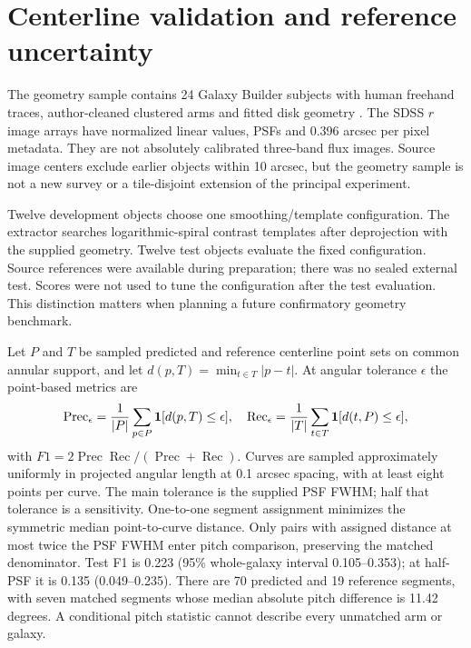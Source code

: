 \documentclass[10pt]{article}
\begin{document}
\section{Centerline validation and reference uncertainty}
The geometry sample contains 24 Galaxy Builder subjects with human freehand
traces, author-cleaned clustered arms and fitted disk geometry
\citep{lingard2020,lingard2021}. The SDSS $r$ image arrays have normalized
linear values, PSFs and 0.396 arcsec per pixel metadata. They are not
absolutely calibrated three-band flux images. Source image centers exclude
earlier objects within 10 arcsec, but the geometry sample is not a new
survey or a tile-disjoint extension of the principal experiment.

Twelve development objects choose one smoothing/template configuration.
The extractor searches logarithmic-spiral contrast templates after
deprojection with the supplied geometry. Twelve test objects evaluate the
fixed configuration. Source references were available during preparation;
there was no sealed external test. Scores were not used to tune the
configuration after the test evaluation. This distinction matters when
planning a future confirmatory geometry benchmark.

Let $P$ and $T$ be sampled predicted and reference centerline point sets on
common annular support, and let $d(p,T)=\min_{t\in T}|p-t|$. At angular
tolerance $\epsilon$ the point-based metrics are
\begin{equation}
 \operatorname{Prec}_\epsilon=\frac{1}{|P|}\sum_{p\in P}\mathbf{1}[d(p,T)\leq\epsilon],
 \quad
 \operatorname{Rec}_\epsilon=\frac{1}{|T|}\sum_{t\in T}\mathbf{1}[d(t,P)\leq\epsilon],
\end{equation}
with $F1=2\operatorname{Prec}\operatorname{Rec}/
(\operatorname{Prec}+\operatorname{Rec})$. Curves are sampled approximately
uniformly in projected angular length at 0.1 arcsec spacing, with at least
eight points per curve. The main tolerance is the supplied PSF FWHM; half
that tolerance is a sensitivity. One-to-one segment assignment minimizes
the symmetric median point-to-curve distance. Only pairs with assigned
distance at most twice the PSF FWHM enter pitch comparison, preserving the
matched denominator.
Test F1 is 0.223 (95\% whole-galaxy interval 0.105--0.353); at half-PSF it
is 0.135 (0.049--0.235). There are 70 predicted and 19 reference segments,
with seven matched segments whose median absolute pitch difference is
11.42 degrees. A conditional pitch statistic cannot describe every unmatched
arm or galaxy.
\end{document}
